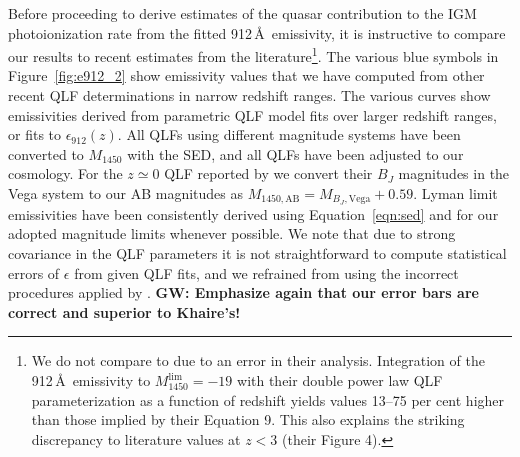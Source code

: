 \documentclass[fleqn,usenatbib]{mnras}
\begin{document}
Before proceeding to derive estimates of the quasar contribution to
the IGM  photoionization rate from the fitted
912\,\AA\ emissivity, it is instructive to compare our results to
recent estimates from the literature\footnote{We do not compare to
  \citet{2017MNRAS.466.1160M} due to an error in their analysis.
  Integration of the 912\,\AA\ emissivity to
  $M_{1450}^\mathrm{lim}=-19$ with their double power law QLF
  parameterization as a function of redshift yields values 13--75 per
  cent higher than those implied by their Equation 9.  This also
  explains the striking discrepancy to literature values at $z<3$
  (their Figure 4).}.  The various blue symbols in
Figure~\ref{fig:e912_2} show emissivity values that we have computed
from other recent QLF determinations in narrow redshift ranges.  The
various curves show emissivities derived from parametric QLF model
fits over larger redshift ranges, or fits to
$\epsilon_{912}\left(z\right)$. All QLFs using different magnitude
systems have been converted to $M_{1450}$ with the
\citet{2015MNRAS.449.4204L} SED, and all QLFs have been adjusted to
our cosmology.  For the $z\simeq 0$ QLF reported by
\citet{2009A&A...507..781S} we convert their $B_J$ magnitudes in the
Vega system to our AB magnitudes as $M_{1450,\mathrm{AB}}=M_{B_J,
  \mathrm{Vega}}+0.59$.  Lyman limit emissivities have been
consistently derived using Equation~\eqref{eqn:sed} and for our
adopted magnitude limits whenever possible.  We note that due to
strong covariance in the QLF parameters it is not straightforward to
compute statistical errors of $\epsilon$ from given QLF fits, and we
refrained from using the incorrect procedures applied by
\citet{2015MNRAS.451L..30K}.  \textbf{GW: Emphasize again that our
  error bars are correct and superior to Khaire's!}
\end{document}
